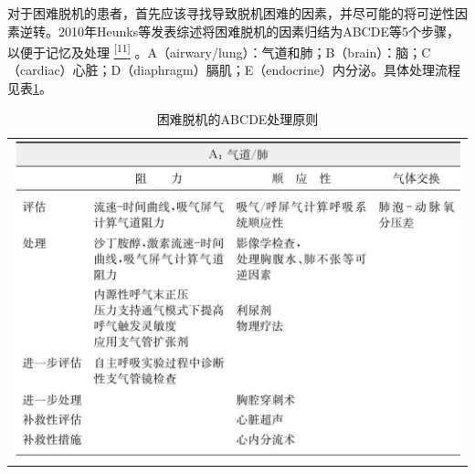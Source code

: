 对于困难脱机的患者，首先应该寻找导致脱机困难的因素，并尽可能的将可逆性因素逆转。2010年Heunks等发表综述将困难脱机的因素归结为ABCDE等5个步骤，以便于记忆及处理
\protect\hyperlink{text00016.htmlux5cux23ch11-15}{\textsuperscript{{[}11{]}}}
。A（airwary/lung）：气道和肺；B（brain）：脑；C（cardiac）心脏；D（diaphragm）膈肌；E（endocrine）内分泌。具体处理流程见表\ref{tab10-1}。

\begin{longtable}{c}
    \caption{困难脱机的ABCDE处理原则}
    \label{tab10-1}
    \endfirsthead
    \caption[]{困难脱机的ABCDE处理原则}
    \endhead
\includegraphics[width=\textwidth,height=\textheight,keepaspectratio]{./images/Image00082.jpg}\\

\end{longtable}
